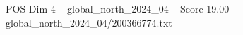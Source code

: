 \begin{textsample}{POS Dim 4 – global\_north\_2024\_04 – Score 19.00 – global\_north\_2024\_04/200366774.txt}
\end{textsample}
